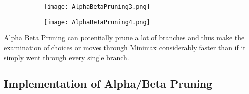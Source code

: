 \begin{figure}
    \caption{An example of branches being pruned} %
    \label{fig:AlphaBetaPruningB}
    \centering %
    \begin{subfigure}[b]{0.3\textwidth}
        \texttt{[image: AlphaBetaPruning3.png]}
    \end{subfigure}
    \begin{subfigure}[b]{0.3\textwidth}
        \texttt{[image: AlphaBetaPruning4.png]}
    \end{subfigure}
  \end{figure}

  Alpha Beta Pruning can potentially prune a lot of branches and 
  thus make the examination of choices or moves through Minimax considerably faster 
  than if it simply went through every single branch.

\subsection{Implementation of Alpha/Beta Pruning}
\label{subsec:Implementation of Alpha/Beta Pruning}

\clearpage